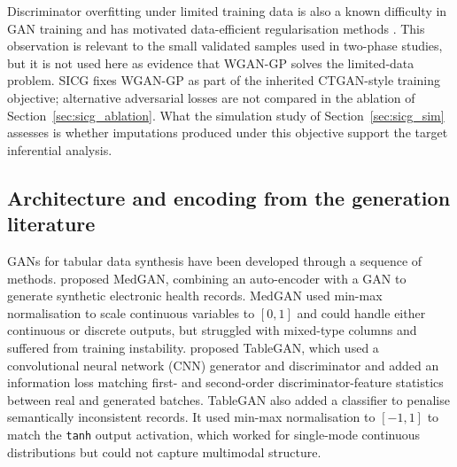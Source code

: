 Discriminator overfitting under limited training data is also a known difficulty in GAN training and has motivated data-efficient regularisation methods \citep{karras2020training, zhao2020differentiable}. This observation is relevant to the small validated samples used in two-phase studies, but it is not used here as evidence that WGAN-GP solves the limited-data problem. SICG fixes WGAN-GP as part of the inherited CTGAN-style training objective; alternative adversarial losses are not compared in the ablation of Section~\ref{sec:sicg_ablation}. What the simulation study of Section~\ref{sec:sicg_sim} assesses is whether imputations produced under this objective support the target inferential analysis.


\subsection{Architecture and encoding from the generation literature}
\label{sec:sicg_arch}

GANs for tabular data synthesis have been developed through a sequence of methods. \citet{choi2017generating} proposed MedGAN, combining an auto-encoder with a GAN to generate synthetic electronic health records. MedGAN used min-max normalisation to scale continuous variables to $[0,1]$ and could handle either continuous or discrete outputs, but struggled with mixed-type columns and suffered from training instability. \citet{park2018data} proposed TableGAN, which used a convolutional neural network (CNN) generator and discriminator and added an information loss matching first- and second-order discriminator-feature statistics between real and generated batches. TableGAN also added a classifier to penalise semantically inconsistent records. It used min-max normalisation to $[-1,1]$ to match the \texttt{tanh} output activation, which worked for single-mode continuous distributions but could not capture multimodal structure.

